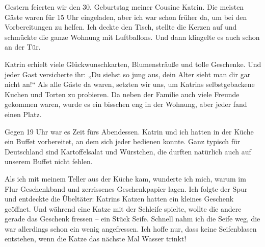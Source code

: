 \documentclass[a4paper]{article}
\title{}
\date{}
\author{Mohammad Rahmani}
\begin{document}
   \maketitle

   Gestern feierten wir den 30. Geburtstag meiner Cousine Katrin. Die meisten Gäste waren für 15 Uhr eingeladen, aber ich war schon früher da, um bei den Vorbereitungen zu helfen. Ich deckte den Tisch, stellte die Kerzen auf und schmückte die ganze Wohnung mit Luftballons. Und dann klingelte es auch schon an der Tür.

   Katrin erhielt viele Glückwunschkarten, Blumensträuße und tolle Geschenke. Und jeder Gast versicherte ihr: „Du siehst so jung aus, dein Alter sieht man dir gar nicht an!“ Als alle Gäste da waren, setzten wir uns, um Katrins selbstgebackene Kuchen und Torten zu probieren. Da neben der Familie auch viele Freunde gekommen waren, wurde es ein bisschen eng in der Wohnung, aber jeder fand einen Platz.

   Gegen 19 Uhr war es Zeit fürs Abendessen. Katrin und ich hatten in der Küche ein Buffet vorbereitet, an dem sich jeder bedienen konnte. Ganz typisch für Deutschland sind Kartoffelsalat und Würstchen, die durften natürlich auch auf unserem Buffet nicht fehlen.

   Als ich mit meinem Teller aus der Küche kam, wunderte ich mich, warum im Flur Geschenkband und zerrissenes Geschenkpapier lagen. Ich folgte der Spur und entdeckte die Übeltäter: Katrins Katzen hatten ein kleines Geschenk geöffnet. Und während eine Katze mit der Schleife spielte, wollte die andere gerade das Geschenk fressen – ein Stück Seife. Schnell nahm ich die Seife weg, die war allerdings schon ein wenig angefressen. Ich hoffe nur, dass keine Seifenblasen entstehen, wenn die Katze das nächste Mal Wasser trinkt!
   
   
\end{document}
